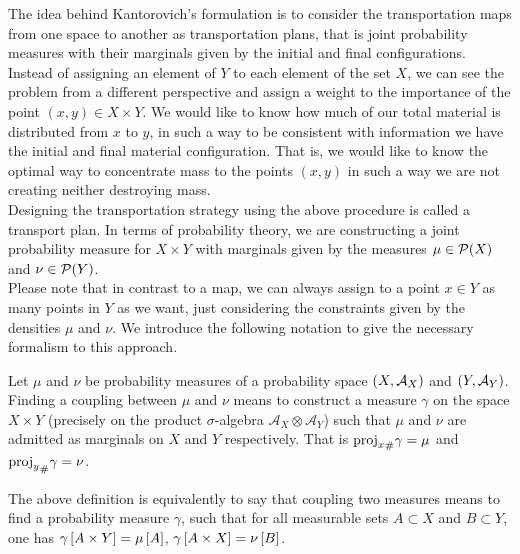 The idea behind Kantorovich's formulation is to consider the transportation maps from one space to another as transportation plans, that is joint probability measures with their marginals given by the initial and final configurations.\\

Instead of assigning an element of $Y$ to each element of the set $X$, we can see the problem from a different perspective and assign a weight to the importance of the point $\left(x, y\right)\in X\times Y$. We would like to know how much of our total material is distributed from $x$ to $y$, in such a way to be consistent with information we have the initial and final material configuration. That is, we would like to know the optimal way to concentrate mass to the points $(x, y)$ in such a way we are not creating neither destroying mass. \\

Designing the transportation strategy using the above procedure is called a transport plan. In terms of probability theory, we are constructing a joint probability measure for $X\times Y$ with marginals given by the measures $\mu \in \mathcal{P}(X)$ and $\nu \in \mathcal{P}(Y)$. \\

Please note that in contrast to a map, we can always assign to a point $x\in Y$ as many points in $Y$ as we want, just considering the constraints given by the densities $\mu$ and $\nu$. We introduce the following notation to give the necessary formalism to this approach. 

\begin{definition}[Coupling]
Let $\mu$ and $\nu$ be probability measures of a probability space $\left( X, \mathcal{A}_X \right)$ and $\left( Y, \mathcal{A}_Y \right)$. Finding a coupling between $\mu$ and $\nu$ means to construct a measure $\gamma$ on the space $X\times Y$ (precisely on the product $\sigma$-algebra $\mathcal{A}_X\otimes\mathcal{A}_Y$) such that $\mu$ and $\nu$ are admitted as marginals on $X$ and $Y$ respectively. That is ${\mathrm{proj}_x}_{\#} \gamma=\mu$ and ${\mathrm{proj}_y}_{\#} \gamma=\nu$. \label{def: Coupling}
\end{definition}
 

The above definition is equivalently to say that coupling two measures means to find a probability measure $\gamma$, such that for all measurable sets $A\subset X$ and $B\subset Y$, one has $\gamma\left[ A\times Y \right]=\mu\left[ A \right]$, $\gamma\left[ A\times X \right]=\nu\left[ B \right]$.

